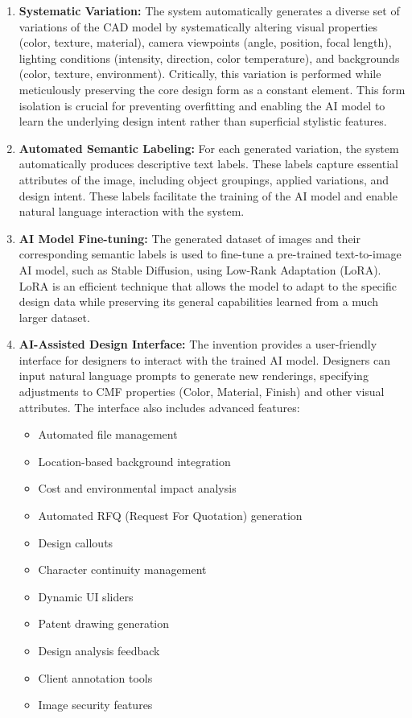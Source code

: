 \documentclass[12pt]{article}
\begin{document}
\begin{enumerate}
    \item \textbf{Systematic Variation:} The system automatically generates a diverse set of variations of the CAD model by systematically altering visual properties (color, texture, material), camera viewpoints (angle, position, focal length), lighting conditions (intensity, direction, color temperature), and backgrounds (color, texture, environment). Critically, this variation is performed while meticulously preserving the core design form as a constant element. This form isolation is crucial for preventing overfitting and enabling the AI model to learn the underlying design intent rather than superficial stylistic features.

    \item \textbf{Automated Semantic Labeling:} For each generated variation, the system automatically produces descriptive text labels. These labels capture essential attributes of the image, including object groupings, applied variations, and design intent. These labels facilitate the training of the AI model and enable natural language interaction with the system. 

    \item \textbf{AI Model Fine-tuning:} The generated dataset of images and their corresponding semantic labels is used to fine-tune a pre-trained text-to-image AI model, such as Stable Diffusion, using Low-Rank Adaptation (LoRA). LoRA is an efficient technique that allows the model to adapt to the specific design data while preserving its general capabilities learned from a much larger dataset. 

    \item \textbf{AI-Assisted Design Interface:} The invention provides a user-friendly interface for designers to interact with the trained AI model. Designers can input natural language prompts to generate new renderings, specifying adjustments to CMF properties (Color, Material, Finish) and other visual attributes. The interface also includes advanced features:
        \begin{itemize}
            \item Automated file management
            \item Location-based background integration 
            \item Cost and environmental impact analysis 
            \item Automated RFQ (Request For Quotation) generation
            \item Design callouts
            \item Character continuity management
            \item Dynamic UI sliders
            \item Patent drawing generation
            \item Design analysis feedback
            \item Client annotation tools
            \item Image security features
        \end{itemize}
\end{enumerate}
\end{document}
